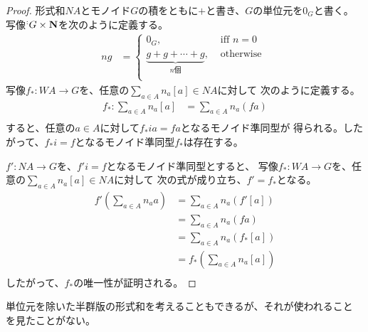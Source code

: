 	\begin{proof} %
		形式和$NA$とモノイド$G$の積をともに$+$と書き、$G$の単位元を$0_G$と書く。
		写像$^:G\times {\mathbf{N}}$を次のように定義する。
		\begin{equation}\begin{split} %
			ng &= \begin{cases}
				0_G, &\text{ iff } n=0 \\
				\underbrace{g + g + \cdots + g}_{n\text{個}}, &\text{ otherwise } \\
			\end{cases}
		\end{split}\end{equation} %
		写像$f_*:WA\to G$を、任意の$\sum_{a\in A}n_a[a]\in NA$に対して
		次のように定義する。
		\begin{equation*}\begin{split}
			f_*: \sum_{a\in A}n_a[a] &= \sum_{a\in A}n_a(fa) \\
		\end{split}\end{equation*}
		すると、任意の$a\in A$に対して$f_*ia=fa$となるモノイド準同型が
		得られる。したがって、$f_*i=f$となるモノイド準同型$f_*$は存在する。

		$f':NA\to G$を、$f'i=f$となるモノイド準同型とすると、
		写像$f_*:WA\to G$を、任意の$\sum_{a\in A}n_a[a]\in NA$に対して
		次の式が成り立ち、$f'=f_*$となる。
		\begin{equation*}\begin{split}
			f'(\sum_{a\in A}n_aa) &= \sum_{a\in A}n_a(f'[a]) \\
				&= \sum_{a\in A}n_a(fa) \\
				&= \sum_{a\in A}n_a(f_*[a]) \\
				&= f_*(\sum_{a\in A}n_a[a]) \\
		\end{split}\end{equation*}
		したがって、$f_*$の唯一性が証明される。
	\end{proof} %

	単位元を除いた半群版の形式和を考えることもできるが、それが使われること
	を見たことがない。

